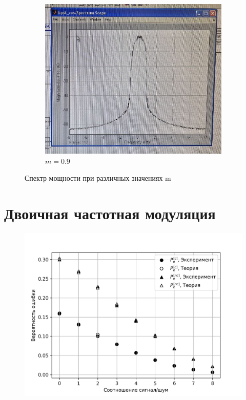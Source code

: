 \documentclass[14pt, a4paper]{article}
\begin{document}
\begin{figure}[H]
\begin{subfigure}{.33\textwidth}
  \includegraphics[width=.95\linewidth]{../images/rt2-7c}
  \caption{$m=0.9$}
\end{subfigure}%
\caption{Спектр мощности при различных значениях m}
\end{figure}

\newpage

\section{Двоичная частотная модуляция}

\begin{figure}[H]
\centering
\includegraphics[width=.8\linewidth]{../images/rt2-8}
\end{figure}
\end{document}
